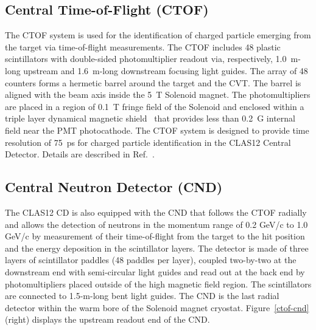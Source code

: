 \documentclass[final,3p,times,twocolumn,authoryear]{elsarticle}
\begin{document}
\subsection{\rm Central Time-of-Flight (CTOF)}
The CTOF system is used for the identification of charged particle emerging 
from the target via time-of-flight measurements. The CTOF includes 48 plastic scintillators with 
double-sided photomultiplier readout via, respectively, 1.0~m-long 
upstream and 1.6~m-long downstream focusing light guides. The array of 48 counters forms a hermetic barrel around the target and the CVT. The barrel is aligned with the beam axis inside the 5~T Solenoid magnet. The 
photomultipliers are placed in a region of 0.1~T fringe field of the Solenoid and enclosed within a triple layer dynamical magnetic shield~\cite{Baturin:2012zz} that provides less than 0.2~G internal field near the PMT photocathode. The CTOF system is designed to provide time resolution of 75~ps for charged particle identification in the CLAS12 Central Detector. Details are described in Ref.~\cite{CTOF}.  

\subsection{\rm Central Neutron Detector (CND)}
The CLAS12 CD is also equipped with the CND that follows the CTOF radially and allows the 
detection of neutrons in the momentum range of 0.2 GeV/c to 1.0 GeV/c by measurement of their time-of-flight from the target 
to the hit position and the energy deposition in the scintillator layers. The detector is made of three layers of scintillator paddles (48 paddles per layer), coupled two-by-two at the downstream end with semi-circular light guides and read out at the back end by photomultipliers placed outside of the high magnetic field region. The scintillators are connected to 1.5-m-long bent 
light guides. The CND is the last radial detector within the warm bore of the Solenoid magnet cryostat. 
Figure~\ref{ctof-cnd} (right) displays the upstream readout end of the CND. 
\end{document}

